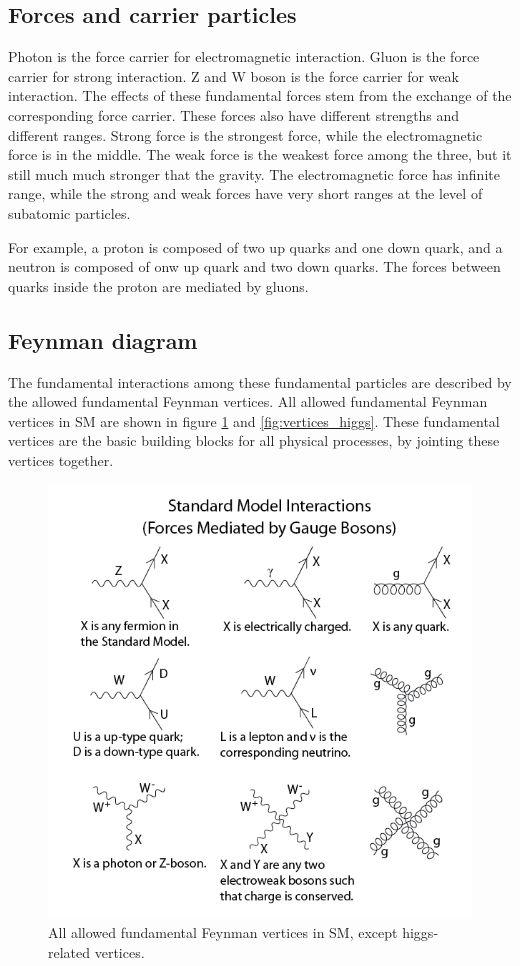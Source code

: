 \subsection{Forces and carrier particles}
Photon is the force carrier for electromagnetic interaction.
Gluon is the force carrier for strong interaction.
Z and W boson is the force carrier for weak interaction.
The effects of these fundamental forces stem from the exchange of the corresponding force carrier.
These forces also have different strengths and different ranges.
Strong force is the strongest force, while the electromagnetic force is in the middle.
The weak force is the weakest force among the three, but it still much much stronger that the gravity.
The electromagnetic force has infinite range, while the strong and weak forces have very short ranges at the level of subatomic particles.

For example, a proton is composed of two up quarks and one down quark, and a neutron is composed of onw up quark and two down quarks.
The forces between quarks inside the proton are mediated by gluons.

\subsection{Feynman diagram}
The fundamental interactions among these fundamental particles are described by the allowed fundamental Feynman vertices.
All allowed fundamental Feynman vertices in SM are shown in figure \ref{fig:vertices_SM} and \ref{fig:vertices_higgs}.
These fundamental vertices are the basic building blocks for all physical processes, by jointing these vertices together.

\begin{figure}
\centering
\includegraphics[width=\textwidth]{data/photo/theory/vertices_SM.png}
\caption{All allowed fundamental Feynman vertices in SM, except higgs-related vertices. \cite{vertices_SM}}
\label{fig:vertices_SM}
\end{figure}

